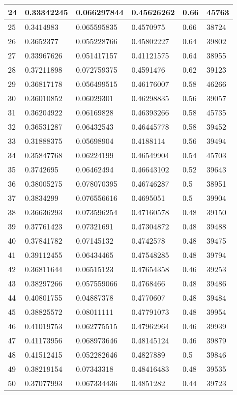 \begin{longtable}{|l|l|l|l|l|l|}
24 & 0.33342245 & 0.066297844 & 0.45626262 & 0.66 & 45763 \\ \hline 
25 & 0.3414983 & 0.065595835 & 0.4570975 & 0.66 & 38724 \\ \hline 
26 & 0.3652377 & 0.055228766 & 0.45802227 & 0.64 & 39802 \\ \hline 
27 & 0.33967626 & 0.051417157 & 0.41121575 & 0.64 & 38955 \\ \hline 
28 & 0.37211898 & 0.072759375 & 0.4591476 & 0.62 & 39123 \\ \hline 
29 & 0.36817178 & 0.056499515 & 0.46176007 & 0.58 & 46266 \\ \hline 
30 & 0.36010852 & 0.06029301 & 0.46298835 & 0.56 & 39057 \\ \hline 
31 & 0.36204922 & 0.06169828 & 0.46393266 & 0.58 & 45735 \\ \hline 
32 & 0.36531287 & 0.06432543 & 0.46445778 & 0.58 & 39452 \\ \hline 
33 & 0.31888375 & 0.05698904 & 0.4188114 & 0.56 & 39494 \\ \hline 
34 & 0.35847768 & 0.06224199 & 0.46549904 & 0.54 & 45703 \\ \hline 
35 & 0.3742695 & 0.06462494 & 0.46643102 & 0.52 & 39643 \\ \hline 
36 & 0.38005275 & 0.078070395 & 0.46746287 & 0.5 & 38951 \\ \hline 
37 & 0.3834299 & 0.076556616 & 0.4695051 & 0.5 & 39904 \\ \hline 
38 & 0.36636293 & 0.073596254 & 0.47160578 & 0.48 & 39150 \\ \hline 
39 & 0.37761423 & 0.07321691 & 0.47304872 & 0.48 & 39488 \\ \hline 
40 & 0.37841782 & 0.07145132 & 0.4742578 & 0.48 & 39475 \\ \hline 
41 & 0.39112455 & 0.06434465 & 0.47548285 & 0.48 & 39794 \\ \hline 
42 & 0.36811644 & 0.06515123 & 0.47654358 & 0.46 & 39253 \\ \hline 
43 & 0.38297266 & 0.057559066 & 0.4768466 & 0.48 & 39486 \\ \hline 
44 & 0.40801755 & 0.04887378 & 0.4770607 & 0.48 & 39484 \\ \hline 
45 & 0.38825572 & 0.08011111 & 0.47791073 & 0.48 & 39954 \\ \hline 
46 & 0.41019753 & 0.062775515 & 0.47962964 & 0.46 & 39939 \\ \hline 
47 & 0.41173956 & 0.068973646 & 0.48145124 & 0.46 & 39879 \\ \hline 
48 & 0.41512415 & 0.052282646 & 0.4827889 & 0.5 & 39846 \\ \hline 
49 & 0.38219154 & 0.07343318 & 0.48416483 & 0.48 & 39535 \\ \hline 
50 & 0.37077993 & 0.067334436 & 0.4851282 & 0.44 & 39723 \\ \hline 
\end{longtable}